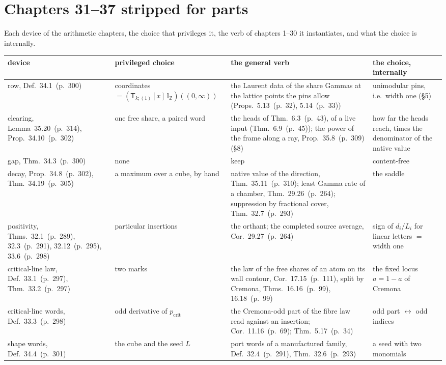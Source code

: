 \documentclass[11pt]{article}
\newcommand{\sT}{\mathsf T}
\newcommand{\IZ}{\mathbb I_{\mathbb Z}}
\newcommand{\Tx}[3]{(\sT_{#1;(1)}[x]\,#2)((#3,\infty))}
\newcommand{\hb}[2]{#1~(p.~#2)}   %
\theoremstyle{plain}
\theoremstyle{remark}
\begin{document}
\section{Chapters 31--37 stripped for parts}

Each device of the arithmetic chapters, the choice that privileges it, the verb of chapters 1--30 it instantiates, and what the choice is internally.

\begin{center}\small
\begin{tabular}{p{3.5cm}p{3.3cm}p{4.6cm}p{3.3cm}}
\toprule
device & privileged choice & the general verb & the choice, internally\\
\midrule
row, Def.~\hb{34.1}{300} & coordinates $=\Tx{k}{\IZ}{0}$ & the Laurent data of the share Gammas at the lattice points the pins allow (Props.~\hb{5.13}{32}, \hb{5.14}{33}) & unimodular pins, i.e.\ width one (\S5)\\
clearing, Lemma~\hb{35.20}{314}, Prop.~\hb{34.10}{302} & one free share, a paired word & the heads of Thm.~\hb{6.3}{43}, of a live input (Thm.~\hb{6.9}{45}); the power of the frame along a ray, Prop.~\hb{35.8}{309} (\S8) & how far the heads reach, times the denominator of the native value\\
gap, Thm.~\hb{34.3}{300} & none & keep & content-free\\
decay, Prop.~\hb{34.8}{302}, Thm.~\hb{34.19}{305} & a maximum over a cube, by hand & native value of the direction, Thm.~\hb{35.11}{310}; least Gamma rate of a chamber, Thm.~\hb{29.26}{264}; suppression by fractional cover, Thm.~\hb{32.7}{293} & the saddle\\
positivity, Thms.~\hb{32.1}{289}, \hb{32.3}{291}, \hb{32.12}{295}, \hb{33.6}{298} & particular insertions & the orthant; the completed source average, Cor.~\hb{29.27}{264} & sign of $d_i/L_i$ for linear letters $=$ width one\\
critical-line law, Def.~\hb{33.1}{297}, Thm.~\hb{33.2}{297} & two marks & the law of the free shares of an atom on its wall contour, Cor.~\hb{17.15}{111}, split by Cremona, Thms.~\hb{16.16}{99}, \hb{16.18}{99} & the fixed locus $a=1-a$ of Cremona\\
critical-line words, Def.~\hb{33.3}{298} & odd derivative of $p_{\mathrm{crit}}$ & the Cremona-odd part of the fibre law read against an insertion; Cor.~\hb{11.16}{69}; Thm.~\hb{5.17}{34} & odd part $\leftrightarrow$ odd indices\\
shape words, Def.~\hb{34.4}{301} & the cube and the seed $L$ & port words of a manufactured family, Def.~\hb{32.4}{291}, Thm.~\hb{32.6}{293} & a seed with two monomials\\

\end{tabular}
\end{center}
\end{document}
